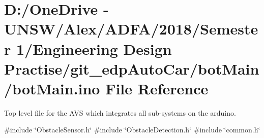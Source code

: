 \hypertarget{bot_main_8ino}{}\section{D\+:/\+One\+Drive -\/ U\+N\+S\+W/\+Alex/\+A\+D\+F\+A/2018/\+Semester 1/\+Engineering Design Practise/git\+\_\+edp\+Auto\+Car/bot\+Main/bot\+Main.ino File Reference}
\label{bot_main_8ino}


Top level file for the A\+VS which integrates all sub-\/systems on the arduino.  


{\ttfamily \#include \char`\"{}Obstacle\+Sensor.\+h\char`\"{}}\newline
{\ttfamily \#include \char`\"{}Obstacle\+Detection.\+h\char`\"{}}\newline
{\ttfamily \#include \char`\"{}common.\+h\char`\"{}}\newline
